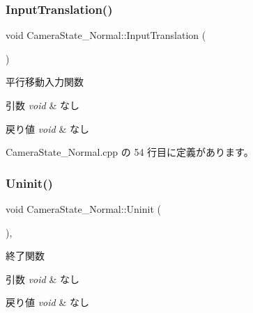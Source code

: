 \subsubsection{\texorpdfstring{Input\+Translation()}{InputTranslation()}}
{\footnotesize\ttfamily void Camera\+State\+\_\+\+Normal\+::\+Input\+Translation (\begin{DoxyParamCaption}{ }\end{DoxyParamCaption})\hspace{0.3cm}{\ttfamily [private]}}



平行移動入力関数 


\begin{DoxyParams}{引数}
{\em void} & なし \\
\hline
\end{DoxyParams}

\begin{DoxyRetVals}{戻り値}
{\em void} & なし \\
\hline
\end{DoxyRetVals}


 Camera\+State\+\_\+\+Normal.\+cpp の 54 行目に定義があります。

\mbox{\label{class_camera_state___normal_a456267d93f83419f635c6e5c692a79bd}} 
\subsubsection{\texorpdfstring{Uninit()}{Uninit()}}
{\footnotesize\ttfamily void Camera\+State\+\_\+\+Normal\+::\+Uninit (\begin{DoxyParamCaption}{ }\end{DoxyParamCaption})\hspace{0.3cm}{\ttfamily [override]}, {\ttfamily [virtual]}}



終了関数 


\begin{DoxyParams}{引数}
{\em void} & なし \\
\hline
\end{DoxyParams}

\begin{DoxyRetVals}{戻り値}
{\em void} & なし \\
\hline
\end{DoxyRetVals}


